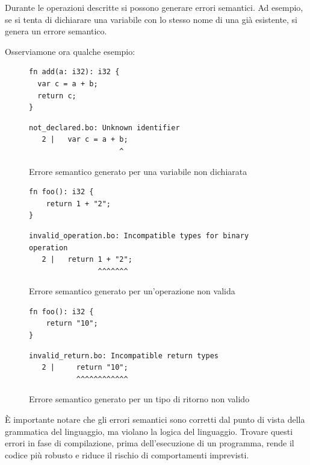 Durante le operazioni descritte si possono generare errori semantici. Ad esempio, se si tenta di dichiarare una variabile con lo stesso nome di una gi\`a esistente, si genera un errore semantico.

Osserviamone ora qualche esempio:
\begin{figure}[H]
	\centering
	\begin{verbatim}
fn add(a: i32): i32 {
  var c = a + b;
  return c;
}
	\end{verbatim}
	\begin{verbatim}
not_declared.bo: Unknown identifier
   2 |   var c = a + b;
                     ^
	\end{verbatim}
	\label{fig:unknown-identifier-error}
	\caption{Errore semantico generato per una variabile non dichiarata}
\end{figure}

\begin{figure}[H]
	\centering
	\begin{verbatim}
fn foo(): i32 {
	return 1 + "2";
}
	\end{verbatim}
	\begin{verbatim}
invalid_operation.bo: Incompatible types for binary operation
   2 |   return 1 + "2";
                ^^^^^^^
	\end{verbatim}
	\label{fig:invalid-binary-operation-error}
	\caption{Errore semantico generato per un'operazione non valida}
\end{figure}

\begin{figure}[H]
	\centering
	\begin{verbatim}
fn foo(): i32 {
	return "10";
}
	\end{verbatim}
	\begin{verbatim}
invalid_return.bo: Incompatible return types
   2 |     return "10";
           ^^^^^^^^^^^^
	\end{verbatim}
	\label{fig:invalid-return-type-error}
	\caption{Errore semantico generato per un tipo di ritorno non valido}
\end{figure}

\`E importante notare che gli errori semantici sono corretti dal punto di vista della grammatica del linguaggio, ma violano la logica del linguaggio. Trovare questi errori in fase di compilazione, prima dell'esecuzione di un programma, rende il codice pi\`u robusto e riduce il rischio di comportamenti imprevisti.

